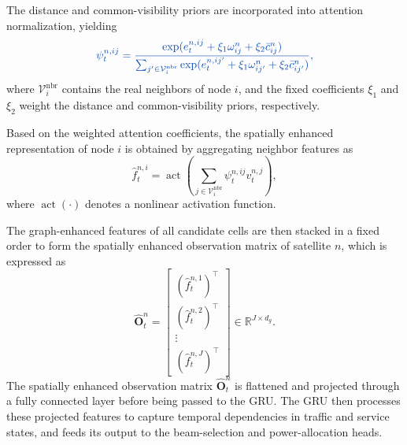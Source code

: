 \documentclass[journal]{IEEEtran}
\newcommand{\revbegin}[1]{\color{revisionblue}\ignorespaces}
\newcommand{\revend}[1]{\color{black}\ignorespaces}
\begin{document}
\revbegin{}The distance and common-visibility priors are incorporated into attention normalization, yielding\revend{}
\begin{equation}\color{revisionblue}
\psi_t^{n,ij}=
\frac{\exp(e_t^{n,ij}+\xi_1\omega_{ij}^n+\xi_2\bar c_{ij}^n)}
{\sum_{j'\in\mathcal V_i^{\mathrm{nbr}}}\exp(e_t^{n,ij'}+\xi_1\omega_{ij'}^n+\xi_2\bar c_{ij'}^n)},
\label{eq:mappo-attn-weight}
\end{equation}
\revbegin{}where $\mathcal V_i^{\mathrm{nbr}}$ contains the real neighbors of node $i$, and the fixed coefficients $\xi_1$ and $\xi_2$ weight the distance and common-visibility priors, respectively.\revend{}

Based on the weighted attention coefficients, the spatially enhanced representation of node $i$ is obtained by aggregating neighbor features as
\begin{equation}
\hat f_t^{n,i}=\operatorname{act}\left(\sum_{j\in\mathcal V_i^{\mathrm{nbr}}}\psi_t^{n,ij} v_t^{n,j}\right),
\label{eq:mappo-spatial-feature}
\end{equation}
where $\operatorname{act}(\cdot)$ denotes a nonlinear activation function.

The graph-enhanced features of all candidate cells are then stacked in a fixed order to form the spatially enhanced observation matrix of satellite $n$, which is expressed as 
\begin{equation}
\hat{\mathbf O}_t^n=
\begin{bmatrix}
(\hat f_t^{n,1})^\top\\
(\hat f_t^{n,2})^\top\\
\vdots\\
(\hat f_t^{n,J})^\top
\end{bmatrix}
\in\mathbb{R}^{J\times d_g}.
\label{eq:mappo-spatial-obs}
\end{equation}
\revbegin{}The spatially enhanced observation matrix $\hat{\mathbf O}_t^n$ is flattened and projected through a fully connected layer before being passed to the GRU. The GRU then processes these projected features to capture temporal dependencies in traffic and service states, and feeds its output to the beam-selection and power-allocation heads.\revend{}
\end{document}

